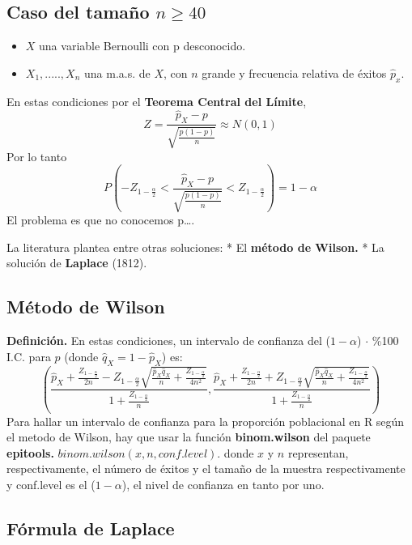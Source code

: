 \documentclass[
]{article}
\providecommand{\tightlist}{%
  \setlength{\itemsep}{0pt}\setlength{\parskip}{0pt}}
\begin{document}
\hypertarget{caso-del-tamauxf1o-n-geq-40}{%
\subsection{\texorpdfstring{Caso del tamaño
\(n \geq 40\)}{Caso del tamaño n \textbackslash geq 40}}\label{caso-del-tamauxf1o-n-geq-40}}

\begin{itemize}
\tightlist
\item
  \(X\) una variable Bernoulli con p desconocido.
\item
  \(X_1,.....,X_n\) una m.a.s. de \(X\), con \(n\) grande y frecuencia
  relativa de éxitos \(\hat{p}_x\).
\end{itemize}

En estas condiciones por el \textbf{Teorema Central del Límite},
\[Z = \frac{\hat{p}_X-p}{\sqrt{\frac{p(1-p)}{n}}} \approx N(0,1)\] Por
lo tanto
\[P(-Z_{1-\frac{\alpha}{2}} < \frac{\hat{p}_X-p}{\sqrt{\frac{p(1-p)}{n}}} < Z_{1-\frac{\alpha}{2}}) = 1 - \alpha\]
El problema es que no conocemos p\ldots.

La literatura plantea entre otras soluciones: * El \textbf{método de
Wilson.} * La solución de \textbf{Laplace} (1812).

\hypertarget{muxe9todo-de-wilson}{%
\subsection{Método de Wilson}\label{muxe9todo-de-wilson}}

\textbf{Definición.} En estas condiciones, un intervalo de confianza del
(\(1-\alpha\)) \(\cdot\) \%100 I.C. para \(p\) (donde
\(\hat{q}_X = 1-\hat{p}_X\)) es:
\[\left(\frac{\hat{p}_X + \frac{Z_{1-\frac{\alpha}{2}}}{2n}- Z_{1-\frac{\alpha}{2}}\sqrt{\frac{\hat{p}_X\hat{q}_X}{n}+ \frac{Z_{1-\frac{\alpha}{2}}}{4n^2}}}{1+\frac{Z_{1-\frac{\alpha}{2}}}{n}}, \frac{\hat{p}_X + \frac{Z_{1-\frac{\alpha}{2}}}{2n}+ Z_{1-\frac{\alpha}{2}}\sqrt{\frac{\hat{p}_X\hat{q}_X}{n}+ \frac{Z_{1-\frac{\alpha}{2}}}{4n^2}}}{1+\frac{Z_{1-\frac{\alpha}{2}}}{n}}\right)\]
Para hallar un intervalo de confianza para la proporción poblacional en
R según el metodo de Wilson, hay que usar la función
\textbf{binom.wilson} del paquete \textbf{epitools.}
\(binom.wilson(x,n,conf.level)\). donde \(x\) y \(n\) representan,
respectivamente, el número de éxitos y el tamaño de la muestra
respectivamente y conf.level es el (\(1-\alpha\)), el nivel de confianza
en tanto por uno.

\hypertarget{fuxf3rmula-de-laplace}{%
\subsection{Fórmula de Laplace}\label{fuxf3rmula-de-laplace}}
\end{document}
